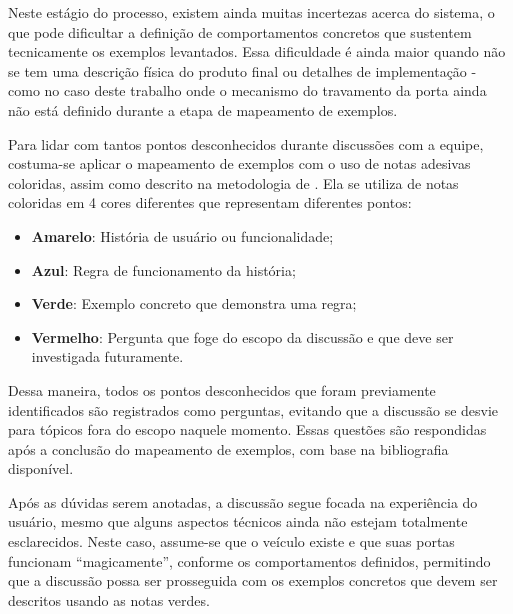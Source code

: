 Neste estágio do processo, existem ainda muitas incertezas acerca do sistema, o que pode dificultar a definição de comportamentos concretos que sustentem 
tecnicamente os exemplos levantados. Essa dificuldade é ainda maior quando não se tem uma descrição física do produto final ou detalhes de implementação - como no 
caso deste trabalho onde o mecanismo do travamento da porta ainda não está definido durante a etapa de mapeamento de exemplos.

Para lidar com tantos pontos desconhecidos durante discussões com a equipe, costuma-se aplicar o mapeamento de exemplos com o uso de notas adesivas coloridas, 
assim como descrito na metodologia de . Ela se utiliza de notas coloridas em 4 cores diferentes que representam diferentes pontos:

\begin{itemize}
	\item \textbf{Amarelo}: História de usuário ou funcionalidade;
	\item \textbf{Azul}: Regra de funcionamento da história;
	\item \textbf{Verde}: Exemplo concreto que demonstra uma regra;
	\item \textbf{Vermelho}: Pergunta que foge do escopo da discussão e que deve ser investigada futuramente.
\end{itemize}

Dessa maneira, todos os pontos desconhecidos que foram previamente identificados são registrados como perguntas, evitando que a discussão se desvie para tópicos 
fora do escopo naquele momento. Essas questões são respondidas após a conclusão do mapeamento de exemplos, com base na bibliografia disponível.

Após as dúvidas serem anotadas, a discussão segue focada na experiência do usuário, mesmo que alguns aspectos técnicos ainda não estejam totalmente esclarecidos. 
Neste caso, assume-se que o veículo existe e que suas portas funcionam “magicamente”, conforme os comportamentos definidos, permitindo que a discussão possa ser 
prosseguida com os exemplos concretos que devem ser descritos usando as notas verdes.




